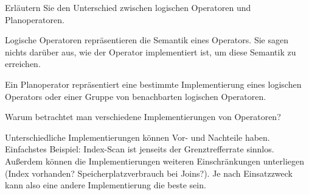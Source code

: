 \item Erläutern Sie den Unterschied zwischen logischen Operatoren und Planoperatoren.

	\begin{solution}
		Logische Operatoren repräsentieren die Semantik eines Operators.
		Sie sagen nichts darüber aus, wie der Operator implementiert ist, um diese Semantik zu erreichen.

		Ein Planoperator repräsentiert eine bestimmte Implementierung eines logischen Operators oder einer Gruppe von benachbarten logischen Operatoren.
	\end{solution}

\item Warum betrachtet man verschiedene Implementierungen von Operatoren?

	\begin{solution}
		Unterschiedliche Implementierungen können Vor- und Nachteile haben. Einfachstes Beispiel: Index-Scan ist jenseits der Grenztrefferrate sinnlos. Außerdem können die Implementierungen weiteren Einschränkungen unterliegen (Index vorhanden? Speicherplatzverbrauch bei Joins?). Je nach Einsatzzweck kann also eine andere Implementierung die beste sein.
	\end{solution}
